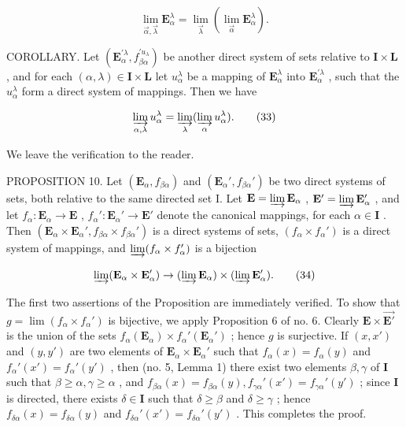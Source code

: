 \[
\lim _ {\overrightarrow {\alpha}, \overrightarrow {\lambda}} \mathbf {E} _ {\alpha} ^ {\lambda} = \lim _ {\overrightarrow {\lambda}} (\lim _ {\overrightarrow {\alpha}} \mathbf {E} _ {\alpha} ^ {\lambda}).\tag{32}
\]

COROLLARY. Let \((\mathbf{E}_{\alpha}^{\prime \lambda}, f_{\beta \alpha}^{\prime u_{\lambda}})\) be another direct system of sets relative to \(\mathbf{I} \times \mathbf{L}\) , and for each \((\alpha, \lambda) \in \mathbf{I} \times \mathbf{L}\) let \(u_{\alpha}^{\lambda}\) be a mapping of \(\mathbf{E}_{\alpha}^{\lambda}\) into \(\mathbf{E}_{\alpha}^{\prime \lambda}\) , such that the \(u_{\alpha}^{\lambda}\) form a direct system of mappings. Then we have

\[
\varinjlim_ {\alpha , \lambda} u _ {\alpha} ^ {\lambda} = \varinjlim_ {\lambda} (\varinjlim_ {\alpha} u _ {\alpha} ^ {\lambda}).\tag{33}
\]

We leave the verification to the reader.

PROPOSITION 10. Let \((\mathbf{E}_{\alpha}, f_{\beta \alpha})\) and \((\mathbf{E}_{\alpha}', f_{\beta \alpha}')\) be two direct systems of sets, both relative to the same directed set I. Let \(\mathbf{E} = \varinjlim \mathbf{E}_{\alpha}\) , \(\mathbf{E}' = \varinjlim \mathbf{E}_{\alpha}'\) , and let \(f_{\alpha}: \mathbf{E}_{\alpha} \to \mathbf{E}\) , \(f_{\alpha}': \mathbf{E}_{\alpha}' \to \mathbf{E}'\) denote the canonical mappings, for each \(\alpha \in \mathbf{I}\) . Then \((\mathbf{E}_{\alpha} \times \mathbf{E}_{\alpha}', f_{\beta \alpha} \times f_{\beta \alpha}')\) is a direct systems of sets, \((f_{\alpha} \times f_{\alpha}')\) is a direct system of mappings, and \(\varinjlim (f_{\alpha} \times f_{\alpha}')\) is a bijection

\[
\varinjlim (\mathbf {E} _ {\alpha} \times \mathbf {E} _ {\alpha} ^ {\prime}) \rightarrow (\varinjlim \mathbf {E} _ {\alpha}) \times (\varinjlim \mathbf {E} _ {\alpha} ^ {\prime}).\tag{34}
\]

The first two assertions of the Proposition are immediately verified. To show that \(g = \lim (f_{\alpha} \times f_{\alpha}')\) is bijective, we apply Proposition 6 of no. 6. Clearly \(\mathbf{E} \times \overrightarrow{\mathbf{E}'}\) is the union of the sets \(f_{\alpha}(\mathbf{E}_{\alpha}) \times f_{\alpha}'(\mathbf{E}_{\alpha}')\) ; hence \(g\) is surjective. If \((x, x')\) and \((y, y')\) are two elements of \(\mathbf{E}_{\alpha} \times \mathbf{E}_{\alpha}'\) such that \(f_{\alpha}(x) = f_{\alpha}(y)\) and \(f_{\alpha}'(x') = f_{\alpha}'(y')\) , then (no. 5, Lemma 1) there exist two elements \(\beta, \gamma\) of \(\mathbf{I}\) such that \(\beta \geqslant \alpha, \gamma \geqslant \alpha\) , and \(f_{\beta \alpha}(x) = f_{\beta \alpha}(y), f_{\gamma \alpha}'(x') = f_{\gamma \alpha}'(y')\) ; since \(\mathbf{I}\) is directed, there exists \(\delta \in \mathbf{I}\) such that \(\delta \geqslant \beta\) and \(\delta \geqslant \gamma\) ; hence \(f_{\delta \alpha}(x) = f_{\delta \alpha}(y)\) and \(f_{\delta \alpha}'(x') = f_{\delta \alpha}'(y')\) . This completes the proof.

